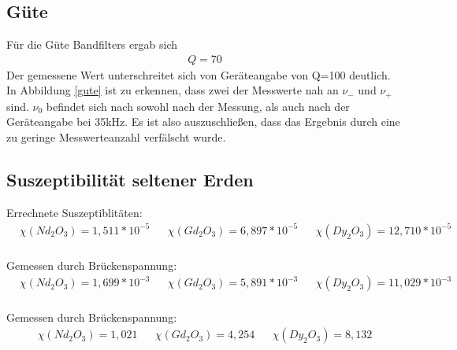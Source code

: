 \subsection{Güte}
Für die Güte Bandfilters ergab sich
\begin{align*}
Q=70
\end{align*}
Der gemessene Wert unterschreitet sich von Geräteangabe von Q=100 deutlich. In Abbildung \ref{gute} ist zu erkennen, dass zwei der Messwerte nah an $\nu_-$ und $\nu_+$ sind. $\nu_0$ befindet sich nach sowohl nach der Messung, als auch nach der Geräteangabe bei 35kHz. Es ist also auszuschließen, dass das Ergebnis durch eine zu geringe Messwerteanzahl verfälscht wurde.

\subsection{Suszeptibilität seltener Erden}
Errechnete Suszeptiblitäten:
\begin{align*}
&\chi(Nd_2O_3)=1,511*10^{-5}&&\chi(Gd_2O_3)=6,897*10^{-5}&&\chi(Dy_2O_3)=12,710*10^{-5}&
\end{align*}
\\
Gemessen durch Brückenspannung:
\begin{align*}
&\chi(Nd_2O_3)=1,699*10^{-3}&&\chi(Gd_2O_3)=5,891*10^{-3}&&\chi(Dy_2O_3)=11,029*10^{-3}&
\end{align*}
\\
Gemessen durch Brückenspannung:
\begin{align*}
&\chi(Nd_2O_3)=1,021&&\chi(Gd_2O_3)=4,254&&\chi(Dy_2O_3)=8,132&
\end{align*}